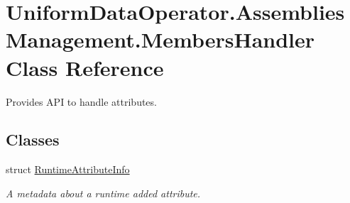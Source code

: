 \hypertarget{class_uniform_data_operator_1_1_assemblies_management_1_1_members_handler}{}\section{Uniform\+Data\+Operator.\+Assemblies\+Management.\+Members\+Handler Class Reference}
\label{class_uniform_data_operator_1_1_assemblies_management_1_1_members_handler}


Provides A\+PI to handle attributes.  


\subsection*{Classes}
\begin{DoxyCompactItemize}
\item 
struct \mbox{\hyperlink{struct_uniform_data_operator_1_1_assemblies_management_1_1_members_handler_1_1_runtime_attribute_info}{Runtime\+Attribute\+Info}}
\begin{DoxyCompactList}\small\item\em A metadata about a runtime added attribute. \end{DoxyCompactList}\end{DoxyCompactItemize}
